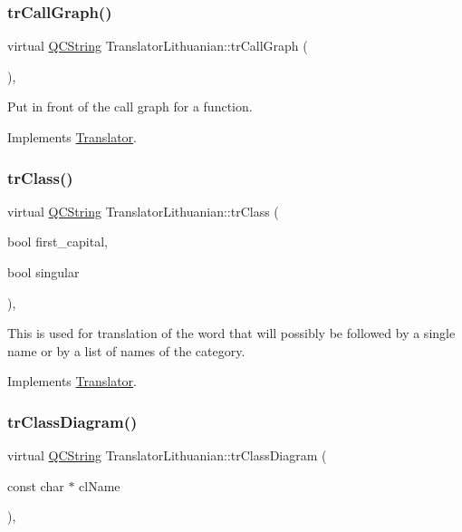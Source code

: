 \subsubsection{\texorpdfstring{trCallGraph()}{trCallGraph()}}
{\footnotesize\ttfamily virtual \mbox{\hyperlink{class_q_c_string}{Q\+C\+String}} Translator\+Lithuanian\+::tr\+Call\+Graph (\begin{DoxyParamCaption}{ }\end{DoxyParamCaption})\hspace{0.3cm}{\ttfamily [inline]}, {\ttfamily [virtual]}}

Put in front of the call graph for a function. 

Implements \mbox{\hyperlink{class_translator}{Translator}}.

\mbox{\label{class_translator_lithuanian_a951bcc0003791c5974b232dc00da3586}} 
\subsubsection{\texorpdfstring{trClass()}{trClass()}}
{\footnotesize\ttfamily virtual \mbox{\hyperlink{class_q_c_string}{Q\+C\+String}} Translator\+Lithuanian\+::tr\+Class (\begin{DoxyParamCaption}\item[{bool}]{first\+\_\+capital,  }\item[{bool}]{singular }\end{DoxyParamCaption})\hspace{0.3cm}{\ttfamily [inline]}, {\ttfamily [virtual]}}

This is used for translation of the word that will possibly be followed by a single name or by a list of names of the category. 

Implements \mbox{\hyperlink{class_translator}{Translator}}.

\mbox{\label{class_translator_lithuanian_a3de9800a055fb8a4be964dd020ad10c4}} 
\subsubsection{\texorpdfstring{trClassDiagram()}{trClassDiagram()}}
{\footnotesize\ttfamily virtual \mbox{\hyperlink{class_q_c_string}{Q\+C\+String}} Translator\+Lithuanian\+::tr\+Class\+Diagram (\begin{DoxyParamCaption}\item[{const char $\ast$}]{cl\+Name }\end{DoxyParamCaption})\hspace{0.3cm}{\ttfamily [inline]}, {\ttfamily [virtual]}}

